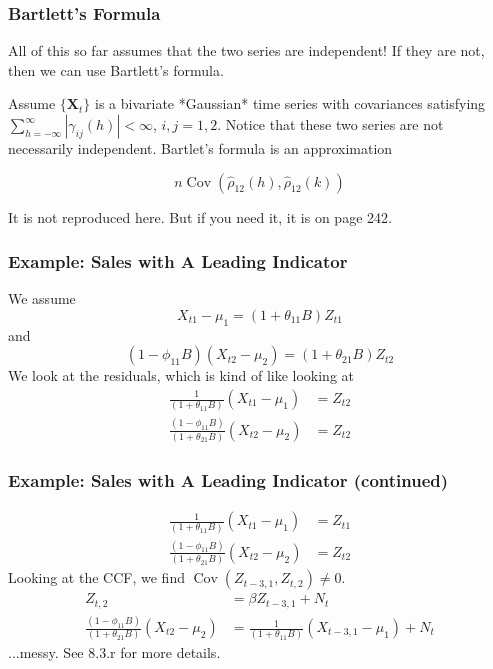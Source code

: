 \documentclass{beamer}
\begin{document}

\begin{frame}
\frametitle{Bartlett's Formula}

All of this so far assumes that the two series are independent! If they are not, then we can use Bartlett's formula. 
\newline

Assume $\{\mathbf{X}_t\}$ is a bivariate *Gaussian* time series with covariances satisfying $\sum_{h=-\infty}^{\infty} | \gamma_{ij}(h) | < \infty$, $i,j = 1,2$. Notice that these two series are not necessarily independent. Bartlet's formula is an approximation 

\[
 n \operatorname{Cov} (\hat{\rho}_{12}(h), \hat{\rho}_{12}(k))
 \]

It is not reproduced here. But if you need it, it is on page 242.

\end{frame}


\begin{frame}
\frametitle{Example: Sales with A Leading Indicator}

We assume 
\[
X_{t1} - \mu_1 = (1 + \theta_{11}B)Z_{t1}
\]
and
\[
(1 - \phi_{11}B)(X_{t2} - \mu_2) = (1 + \theta_{21}B)Z_{t2}
\]
We look at the residuals, which is kind of like looking at 
\begin{align*}
\frac{1}{(1 + \theta_{11}B)} \left(X_{t1} - \mu_1\right) &= Z_{t2}\\
\frac{(1 - \phi_{11}B)}{(1 + \theta_{21}B)} (X_{t2} - \mu_2) &= Z_{t2}
\end{align*}


\end{frame}


\begin{frame}
\frametitle{Example: Sales with A Leading Indicator (continued)}

\begin{align*}
\frac{1}{(1 + \theta_{11}B)} \left(X_{t1} - \mu_1\right) &= Z_{t1}\\
\frac{(1 - \phi_{11}B)}{(1 + \theta_{21}B)} (X_{t2} - \mu_2) &= Z_{t2}
\end{align*}
Looking at the CCF, we find $\operatorname{Cov}( Z_{t-3,1}, Z_{t,2}  ) \neq 0$.
\begin{align*}
Z_{t,2} &= \beta Z_{t-3,1} + N_t \\
\frac{(1 - \phi_{11}B)}{(1 + \theta_{21}B)} (X_{t2} - \mu_2) &= \frac{1}{(1 + \theta_{11}B)} \left(X_{t-3,1} - \mu_1\right) + N_t
\end{align*}
...messy. See 8.3.r for more details.
\end{frame}
\end{document}
